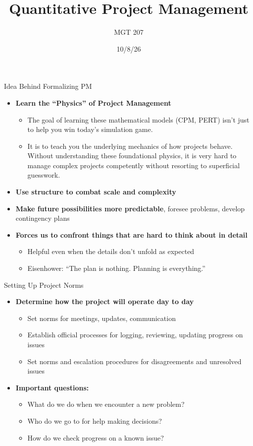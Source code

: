 \documentclass[11pt,aspectratio=169]{beamer}
\title[Quantitative Project Management]{Quantitative Project Management}
\subtitle{MGT 207}
\author{}
\date{10/8/26}
\begin{document}
\begin{frame}
    \titlepage
\end{frame}

\begin{frame}{Idea Behind Formalizing PM}
    \begin{itemize}[<+->]
        \item \textbf{Learn the ``Physics'' of Project Management}
        \begin{itemize}
            \item The goal of learning these mathematical models (CPM, PERT) isn't just to help you win today's simulation game. 
            \item It is to teach you the underlying mechanics of how projects behave. Without understanding these foundational physics, it is very hard to manage complex projects competently without resorting to superficial guesswork.
        \end{itemize}
        \item \textbf{Use structure to combat scale and complexity}
        \item \textbf{Make future possibilities more predictable}, foresee problems, develop contingency plans
        \item \textbf{Forces us to confront things that are hard to think about in detail}
        \begin{itemize}
            \item Helpful even when the details don't unfold as expected
            \item Eisenhower: ``The plan is nothing. Planning is everything.''
        \end{itemize}
    \end{itemize}
\end{frame}

\begin{frame}{Setting Up Project Norms}
    \begin{itemize}[<+->]
        \item \textbf{Determine how the project will operate day to day}
        \begin{itemize}
            \item Set norms for meetings, updates, communication
            \item Establish official processes for logging, reviewing, updating progress on issues
            \item Set norms and escalation procedures for disagreements and unresolved issues
        \end{itemize}
        \item \textbf{Important questions:}
        \begin{itemize}
            \item What do we do when we encounter a new problem?
            \item Who do we go to for help making decisions?
            \item How do we check progress on a known issue?
        \end{itemize}
    \end{itemize}
\end{frame}
\end{document}
